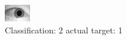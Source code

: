 \begin{figure}[h!]
\begin{center}
\includegraphics[width=0.60\columnwidth]{figures/ID1439_class_2_target_1.png}
\end{center}
\caption{ Classification: 2 actual target: 1}
\label{fig:ID1439_class_2_target_1}
\end{figure}

